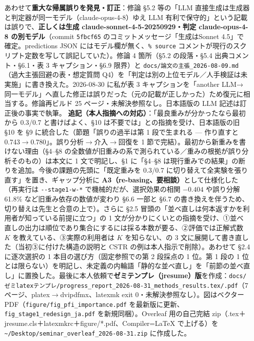 \documentclass[11pt,a4paper]{jsarticle}
\begin{document}
\begin{itemize}[nosep]
    あわせて\textbf{重大な帰属誤りを発見・訂正}：修論 \S5.2 等の「LLM 直接生成は生成器と判定器が同一モデル（claude-opus-4-8）ゆえ LLM 有利で保守的」という記載は誤りで、\textbf{正しくは生成 claude-sonnet-4-5-20250929・判定 claude-opus-4-8 の別モデル}（commit \texttt{5fbcf65} のコミットメッセージ「生成はSonnet 4.5」で確定。predictions JSON にはモデル欄が無く、\texttt{\% source} コメントが現行のスクリプト定数を写して誤記していた）。修論 4 箇所（\S5.2 の段落・\S5.4 出典コメント・\S6.1・表 3 キャプション・\S6.9 限界）と \texttt{docs/論文の主張\_2026-08-09.md}（過大主張回避の表・想定質問 Q4）を「判定は別の上位モデル／人手検証は未実施」に書き換えた。2026-08-30 に私が表 3 キャプションを「another LLM→同一モデル」へ直した修正は誤りだった（元の記載が正しかった）ため復元に相当する。修論再ビルド 25 ページ・未解決参照なし。日本語版の LLM 記述は訂正後の事実で執筆。
    \textbf{追記（本人指摘への対応）}：「最良重みが分かったなら最初から 0.3/0.7 と書けばよく、\S10 は不要では」との指摘を受け、日本語版の旧 \S10 を \S9 に統合した（節題「誤りの過半は第 1 段で生まれる --- 作り直すと 0.743$\to$0.780」。誤り分析$\to$介入$\to$回復を 1 節で完結）。最初から新重みを書けない理由（\S4--\S8 の全数値が旧重みの系で測られている／重みの根拠が誤り分析そのもの）は本文に 1 文で明記し、\S1 に「\S4--\S8 は現行重みでの結果」の断りを追加。今後の課題の先頭に「既定重みを 0.3/0.7 に切り替えて全実験を張り直す」を置き、ギャップ分析に \textbf{A3（re-basing、要相談）}として仕様化した（再実行は \texttt{-{}-stage1-w-*} で機械的だが、選択効果の相関 $-0.404$ や誤り分解 61.8\% など旧重み依存の数値が変わり \S6.6 一部と \S6.7 の書き換えを伴うため、切り替えは先生と合意の上で）。さらに \S2.5 冒頭の「並べ直しは何本返すかを利用者が知っている前提に立つ」の 1 文が分かりにくいとの指摘を受け、①並べ直しの出力は順位であり集合にするには採る本数が要る、②評価では正解式数 $K$ を教えている、③実際の利用者は $K$ を知らない、の 3 文に展開して書き直した（当初③に付けた構造の説明と CSTR の例は本人指示で削除）。あわせて \S2.4 に逐次選択の 1 本目の選び方（固定参照での第 2 段採点の 1 位。第 1 段の 1 位とは限らない）を明記し、未定義の内輪語「静的な並べ直し」を「前節の並べ直し」に置換した。最後に本人依頼で\textbf{ゼミテンプレ（jresume）版}を作成：\texttt{docs/ゼミlatexテンプレ/progress\_report\_2026-08-31\_methods\_results.tex/.pdf}（7 ページ、platex$\to$dvipdfmx、latexmk exit 0・未解決参照なし）。図はベクター PDF（\texttt{figure/fig\_pfi\_importance.pdf} を最新版に更新、\texttt{fig\_stage1\_redesign\_ja.pdf} を新規同梱）。Overleaf 用の自己完結 zip（.tex＋jresume.cls＋latexmkrc＋figure/*.pdf、Compiler=LaTeX で上げる）を \texttt{\textasciitilde/Desktop/seminar\_overleaf\_2026-08-31.zip} に作成した。

\end{itemize}
\end{document}
